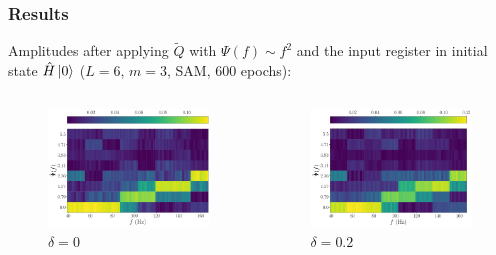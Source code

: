 \documentclass{beamer}
\begin{document}
\begin{frame}
\frametitle{Results}
Amplitudes after applying $\tilde{Q}$ with $\Psi(f) \sim f^2$ and the input register in initial state $\hat{H} \ket{0}$ ($L=6$, $m=3$, SAM, 600 epochs):
\begin{columns}
\begin{column}{0.5\textwidth}
\begin{figure}
\centering
\includegraphics[width=\textwidth]{im/Q_amp_quadratic_0.0_H.pdf}
\caption{$\delta =0$}
\end{figure}
\end{column}
\begin{column}{0.5\textwidth}
\begin{figure}
\centering
\includegraphics[width=\textwidth]{im/Q_amp_quadratic_0.2_H.pdf}
\caption{$\delta =0.2$}
\end{figure} 
\end{column}
\end{columns}
\end{frame}
\end{document}
